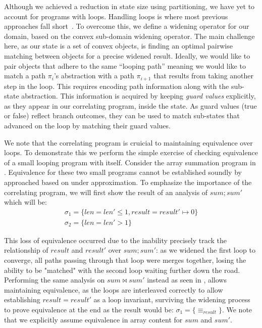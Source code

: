 

Although we achieved a reduction in state size using partitioning, we have yet to account for programs with loops. Handling loops is where most previous approaches fall short~\cite{GodlinStrichman09, KawaguchiLahiriRebelo10, DwyerElbaumPerson08, EnglerRamos11}. To overcome this, we define a widening operator for our domain, based on the convex sub-domain widening operator. The main challenge here, as our state is a set of convex objects, is finding an optimal pairwise matching between objects for a precise widened result. Ideally, we would like to pair objects that adhere to the same ``looping path'' meaning we would like to match a path $\pi_i$'s abstraction with a path $\pi_{i+1}$ that results from taking another step in the loop. This requires encoding path information along with the sub-state abstraction. This information is acquired by keeping \emph{guard values} explicitly, as they appear in our correlating program, inside the state. As guard values (true or false) reflect branch outcomes, they can be used to match sub-states that advanced on the loop by matching their guard values.



We note that the correlating program is cruicial to maintaining equivalence over loops. To demonstrate this we perform the simple exercise of checking equivalence of a small looping program with itself. Consider the array summation program in . Equivalence for these two small programs cannot be established soundly by approached based on under approximation. To emphasize the importance of the correlating program, we will first show the result of an analysis of $sum;sum'$ which will be:
{\footnotesize
\[
\begin{array}{c}
\sigma_1 = \{len = len' \leq 1, result = result' \mapsto 0\} \\
\sigma_2 = \{len = len' > 1\}
\end{array}
\]
}



This loss of equivalence occurred due to the inability precisely track the relationship of $result$ and $result'$ over $sum;sum'$: as we widened the first loop to converge, all paths passing through that loop were merges together, losing the ability to be "matched" with the second loop waiting further down the road. Performing the same analysis on $sum \bowtie sum'$ instead as seen in , allows maintaining equivalence, as the loops are interleaved correctly to allow establishing $result = result'$ as a loop invariant, surviving the widening process to prove equivalence at the end as the result would be:
{\footnotesize $\sigma_1 = \{\equiv_{result}\}$}.
We note that we explicitly assume equivalence in array content for $sum$ and $sum'$.

